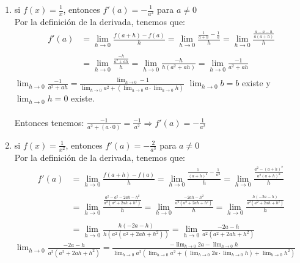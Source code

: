 \documentclass[12pt]{article}
\begin{document}
\begin{enumerate}[\hspace{9px} a)]
    \item si \(f(x)=\displaystyle\frac{1}{x}\), entonces \(f'(a)=-\displaystyle\frac{1}{a^2}\) para \(a \neq 0\)\\

        Por la definición de la derivada, tenemos que:
        \begin{align*}
            f'(a)&=\displaystyle\lim_{h \to 0}\frac{f(a+h)-f(a)}{h}=\displaystyle\lim_{h \to 0}\frac{\displaystyle\frac{1}{a+h}-\frac{1}{a}}{h} = \displaystyle\lim_{h \to 0}\frac{\displaystyle\frac{a-a-h}{a(a+h)}}{h}\\ \\
            &=\displaystyle\lim_{h \to 0}\frac{\displaystyle\frac{-h}{a^2+ah}}{h}=\displaystyle\lim_{h \to 0}\frac{-h}{h(a^2+ah)}=\displaystyle\lim_{h \to 0}\frac{-1}{a^2+ah}\\
        \end{align*}
        \(\displaystyle\lim_{h \to 0}\frac{-1}{a^2+ah} = \frac{\displaystyle\lim_{h \to 0}-1}{\displaystyle\lim_{h \to 0}a^2+(\displaystyle\lim_{h \to 0}a \cdot \displaystyle\lim_{h \to 0}h)}\) \qquad
        \(\displaystyle\lim_{h \to 0}b=b\) existe y \(\displaystyle\lim_{h \to 0}h=0\) existe.\\ \\

        Entonces tenemos: \quad \(\displaystyle\frac{-1}{a^2+(a \cdot 0)}=\frac{-1}{a^2} \Longrightarrow f'(a)=-\frac{1}{a^2}\)\\

    \item si \(f(x)=\displaystyle\frac{1}{x^2}\), entonces \(f'(a)=-\displaystyle\frac{2}{a^3}\) para \(a \neq 0\)\\

        Por la definición de la derivada, tenemos que:
        \begin{align*}
            f'(a)&=\displaystyle\lim_{h \to 0}\frac{f(a+h)-f(a)}{h}=\displaystyle\lim_{h \to 0}\frac{\displaystyle\frac{1}{(a+h)^2}-\frac{1}{a^2}}{h}=\displaystyle\lim_{h \to 0}\frac{\displaystyle\frac{a^2-(a+h)^2}{a^2(a+h)^2}}{h}\\ \\
            &=\displaystyle\lim_{h \to 0}\frac{\displaystyle\frac{a^2-a^2-2ah-h^2}{a^2(a^2+2ah+h^2)}}{h}=\displaystyle\lim_{h \to 0}\frac{\displaystyle\frac{-2ah-h^2}{a^2(a^2+2ah+h^2)}}{h}=\displaystyle\lim_{h \to 0}\frac{\displaystyle\frac{h(-2a-h)}{a^2(a^2+2ah+h^2)}}{h}\\ \\
            &=\displaystyle\lim_{h \to 0}\frac{h(-2a-h)}{h(a^2(a^2+2ah+h^2))}=\displaystyle\lim_{h \to 0}\frac{-2a-h}{a^2(a^2+2ah+h^2)}
        \end{align*}
        \(\displaystyle\lim_{h \to 0}\frac{-2a-h}{a^2(a^2+2ah+h^2)}=\displaystyle\frac{-\displaystyle\lim_{h \to 0}2a-\displaystyle\lim_{h \to 0}h}{\displaystyle\lim_{h \to 0}a^2(\displaystyle\lim_{h \to 0}a^2+(\displaystyle\lim_{h \to 0}2a \cdot \displaystyle\lim_{h \to 0}h)+\displaystyle\lim_{h \to 0}h^2)}\)\\ \\


\end{enumerate}
\end{document}
